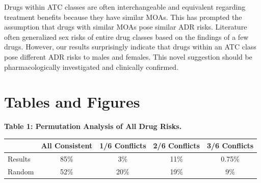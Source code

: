 \documentclass[11pt, oneside]{article}
\begin{document}
Drugs within ATC classes are often interchangeable and equivalent regarding treatment benefits because they have similar MOAs. This has prompted the assumption that drugs with similar MOAs pose similar ADR risks. Literature often generalized sex risks of entire drug classes based on the findings of a few drugs. \cite{bigos_sex_2009,drici_is_2001,ofotokun_sex_2003} However, our results surprisingly indicate that drugs within an ATC class pose different ADR risks to males and females. This novel suggestion should be pharmacologically investigated and clinically confirmed.  

\newpage
\section{Tables and Figures}
\bigskip

\textbf{Table 1: Permutation Analysis of All Drug Risks.}
\medskip\\
\begin{tabular}{lcccc}
\toprule
{} & All Consistent & 1/6 Conflicts & 2/6 Conflicts & 3/6 Conflicts \\
\midrule
Results & 85\% &   3\% &  11\% &  0.75\% \\
Random  & 52\% &  20\% &  19\% &  9\% \\
\bottomrule
\end{tabular}
\bigskip
\bigskip
\bigskip
\end{document}
